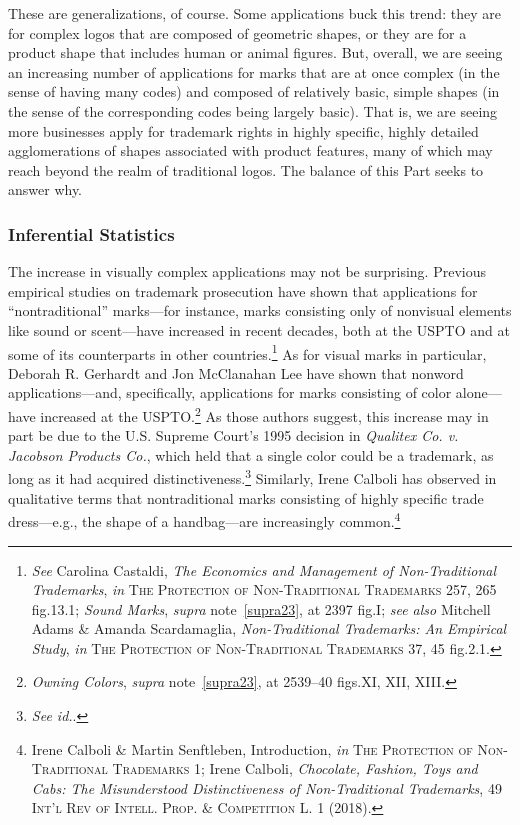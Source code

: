 \documentclass[letterpaper, 11pt, oneside]{article}
\begin{document}
These are generalizations, of course. Some applications buck this trend: they are for complex logos that are composed of geometric shapes, or they are for a product shape that includes human or animal figures. But, overall, we are seeing an increasing number of applications for marks that are at once complex (in the sense of having many codes) and composed of relatively basic, simple shapes (in the sense of the corresponding codes being largely basic). That is, we are seeing more businesses apply for trademark rights in highly specific, highly detailed agglomerations of shapes associated with product features, many of which may reach beyond the realm of traditional logos. The balance of this Part seeks to answer why.

\subsubsection{Inferential Statistics}\label{subsubsec:2B2}

The increase in visually complex applications may not be surprising. Previous empirical studies on trademark prosecution have shown that applications for ``nontraditional'' marks—for instance, marks consisting only of nonvisual elements like sound or scent—have increased in recent decades, both at the USPTO and at some of its counterparts in other countries.\footnote{\textit{See} Carolina Castaldi, \textit{The Economics and Management of Non-Traditional Trademarks}, \textit{in} \textsc{The Protection of Non-Traditional Trademarks} 257, 265 fig.13.1; \textit{Sound Marks}, \textit{supra} note~\ref{supra23}, at 2397 fig.I; \textit{see also} Mitchell Adams \& Amanda Scardamaglia, \textit{Non-Traditional Trademarks: An Empirical Study}, \textit{in} \textsc{The Protection of Non-Traditional Trademarks} 37, 45 fig.2.1.} As for visual marks in particular, Deborah R. Gerhardt and Jon McClanahan Lee have shown that nonword applications—and, specifically, applications for marks consisting of color alone—have increased at the USPTO.\footnote{\textit{Owning Colors}, \textit{supra} note~\ref{supra23}, at 2539–40 figs.XI, XII, XIII.} As those authors suggest, this increase may in part be due to the U.S. Supreme Court's 1995 decision in \textit{Qualitex Co. v. Jacobson Products Co.}, which held that a single color could be a trademark, as long as it had acquired distinctiveness.\footnote{\textit{See id.}.} Similarly, Irene Calboli has observed in qualitative terms that nontraditional marks consisting of highly specific trade dress—e.g., the shape of a handbag—are increasingly common.\footnote{Irene Calboli \& Martin Senftleben, Introduction, \textit{in} \textsc{The Protection of Non-Traditional Trademarks} 1; Irene Calboli, \textit{Chocolate, Fashion, Toys and Cabs: The Misunderstood Distinctiveness of Non-Traditional Trademarks}, 49 \textsc{Int'l Rev of Intell. Prop. \& Competition L.} 1 (2018).}
\end{document}
